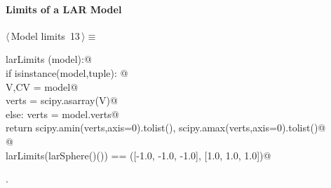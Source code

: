 \documentclass[11pt,oneside]{article}	%
\begin{document}
\paragraph{Limits of a LAR Model}
\begin{flushleft} \small \label{scrap27}
\protect{}$\langle\,$Model limits\nobreak\ {\footnotesize 13}$\,\rangle\equiv$
\vspace{-1ex}
\begin{list}{}{} \item
\mbox{}\verb@def larLimits (model):@\\
\mbox{}\verb@   if isinstance(model,tuple): @\\
\mbox{}\verb@      V,CV = model@\\
\mbox{}\verb@      verts = scipy.asarray(V)@\\
\mbox{}\verb@   else: verts = model.verts@\\
\mbox{}\verb@   return scipy.amin(verts,axis=0).tolist(), scipy.amax(verts,axis=0).tolist()@\\
\mbox{}\verb@   @\\
\mbox{}\verb@assert larLimits(larSphere()()) == ([-1.0, -1.0, -1.0], [1.0, 1.0, 1.0])@\\
\mbox{}\verb@@{\NWsep}
\end{list}
\vspace{-1ex}
\footnotesize\addtolength{\baselineskip}{-1ex}
\begin{list}{}{\setlength{\itemsep}{-\parsep}\setlength{\itemindent}{-\leftmargin}}
\item {\NWtxtMacroNoRef}.
\end{list}
\end{flushleft}
\end{document}
